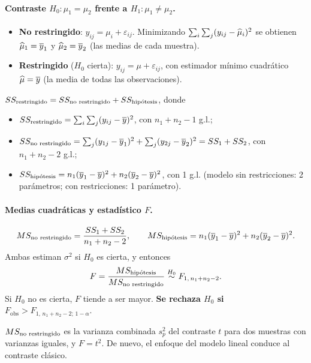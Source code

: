 \paragraph{Contraste $H_0\colon \mu_1=\mu_2$ frente a $H_1\colon \mu_1\neq\mu_2$.}
\begin{itemize}
  \item \textbf{No restringido}: $y_{ij}=\mu_i+\varepsilon_{ij}$. Minimizando
    $\sum_i\sum_j (y_{ij}-\widehat{\mu}_i)^2$ se obtienen $\widehat{\mu}_1=\overline{y}_1$ y
    $\widehat{\mu}_2=\overline{y}_2$ (las medias de cada muestra).
  \item \textbf{Restringido} ($H_0$ cierta): $y_{ij}=\mu+\varepsilon_{ij}$, con estimador
    mínimo cuadrático $\widehat{\mu}=\overline{y}$ (la media de todas las observaciones).
\end{itemize}

\begin{proposicion}
  $SS_{\text{restringido}} = SS_{\text{no restringido}} + SS_{\text{hipótesis}}$, donde
  \begin{itemize}
    \item $SS_{\text{restringido}} = \sum_i\sum_j (y_{ij}-\overline{y})^2$, con $n_1+n_2-1$ g.l.;
    \item $SS_{\text{no restringido}} = \sum_j (y_{1j}-\overline{y}_1)^2 + \sum_j (y_{2j}-\overline{y}_2)^2
      = SS_1+SS_2$, con $n_1+n_2-2$ g.l.;
    \item $SS_{\text{hipótesis}} = n_1(\overline{y}_1-\overline{y})^2 + n_2(\overline{y}_2-\overline{y})^2$, con
      1 g.l. (modelo sin restricciones: 2 parámetros; con restricciones: 1 parámetro).
  \end{itemize}
\end{proposicion}

\paragraph{Medias cuadráticas y estadístico $F$.}
\[
  MS_{\text{no restringido}} = \frac{SS_1+SS_2}{n_1+n_2-2}, \qquad
  MS_{\text{hipótesis}} = n_1(\overline{y}_1-\overline{y})^2 + n_2(\overline{y}_2-\overline{y})^2 .
\]
Ambas estiman $\sigma^2$ si $H_0$ es cierta, y entonces
\[
  F = \frac{MS_{\text{hipótesis}}}{MS_{\text{no restringido}}} \overset{H_0}{\sim} F_{1,\,n_1+n_2-2} .
\]
Si $H_0$ no es cierta, $F$ tiende a ser mayor. \textbf{Se rechaza $H_0$ si
$F_{\text{obs}} > F_{1,\,n_1+n_2-2;\,1-\alpha}$}.

\begin{nota}
  $MS_{\text{no restringido}}$ es la varianza combinada $s_p^2$ del contraste $t$ para dos muestras
  con varianzas iguales, y $F=t^2$. De nuevo, el enfoque del modelo lineal conduce al contraste
  clásico.
\end{nota}

